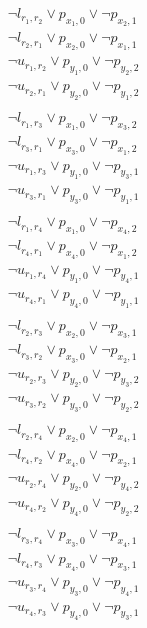 \documentclass[a4paper,11pt]{book}
\begin{document}
\begin{equation}
	\begin{aligned}
		& \neg l_{r_1,r_2} \lor p_{x_1,0} \lor \neg p_{x_2,1} \\
		& \neg l_{r_2,r_1} \lor p_{x_2,0} \lor \neg p_{x_1,1} \\
		& \neg u_{r_1,r_2} \lor p_{y_1,0} \lor \neg p_{y_2,2} \\
		& \neg u_{r_2,r_1} \lor p_{y_2,0} \lor \neg p_{y_1,2} \\
		\\
		& \neg l_{r_1,r_3} \lor p_{x_1,0} \lor \neg p_{x_3,2} \\
		& \neg l_{r_3,r_1} \lor p_{x_3,0} \lor \neg p_{x_1,2} \\
		& \neg u_{r_1,r_3} \lor p_{y_1,0} \lor \neg p_{y_3,1} \\
		& \neg u_{r_3,r_1} \lor p_{y_3,0} \lor \neg p_{y_1,1} \\
		\\
		& \neg l_{r_1,r_4} \lor p_{x_1,0} \lor \neg p_{x_4,2} \\
		& \neg l_{r_4,r_1} \lor p_{x_4,0} \lor \neg p_{x_1,2} \\
		& \neg u_{r_1,r_4} \lor p_{y_1,0} \lor \neg p_{y_4,1} \\
		& \neg u_{r_4,r_1} \lor p_{y_4,0} \lor \neg p_{y_1,1} \\
		\\
		& \neg l_{r_2,r_3} \lor p_{x_2,0} \lor \neg p_{x_3,1} \\
		& \neg l_{r_3,r_2} \lor p_{x_3,0} \lor \neg p_{x_2,1} \\
		& \neg u_{r_2,r_3} \lor p_{y_2,0} \lor \neg p_{y_3,2} \\
		& \neg u_{r_3,r_2} \lor p_{y_3,0} \lor \neg p_{y_2,2} \\
		\\
		& \neg l_{r_2,r_4} \lor p_{x_2,0} \lor \neg p_{x_4,1} \\
		& \neg l_{r_4,r_2} \lor p_{x_4,0} \lor \neg p_{x_2,1} \\
		& \neg u_{r_2,r_4} \lor p_{y_2,0} \lor \neg p_{y_4,2} \\
		& \neg u_{r_4,r_2} \lor p_{y_4,0} \lor \neg p_{y_2,2} \\
		\\
		& \neg l_{r_3,r_4} \lor p_{x_3,0} \lor \neg p_{x_4,1} \\
		& \neg l_{r_4,r_3} \lor p_{x_4,0} \lor \neg p_{x_3,1} \\
		& \neg u_{r_3,r_4} \lor p_{y_3,0} \lor \neg p_{y_4,1} \\
		& \neg u_{r_4,r_3} \lor p_{y_4,0} \lor \neg p_{y_3,1}
	\end{aligned}
\end{equation}
\end{document}
